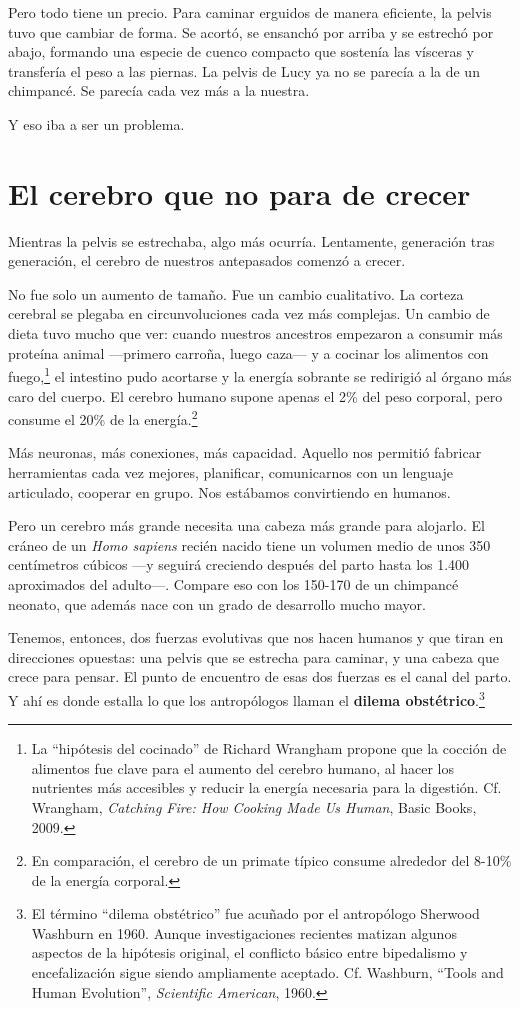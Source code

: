 Pero todo tiene un precio. Para caminar erguidos de manera eficiente, la pelvis tuvo que cambiar de forma. Se acortó, se ensanchó por arriba y se estrechó por abajo, formando una especie de cuenco compacto que sostenía las vísceras y transfería el peso a las piernas. La pelvis de Lucy ya no se parecía a la de un chimpancé. Se parecía cada vez más a la nuestra.

Y eso iba a ser un problema.

\section{El cerebro que no para de crecer}

Mientras la pelvis se estrechaba, algo más ocurría. Lentamente, generación tras generación, el cerebro de nuestros antepasados comenzó a crecer.

No fue solo un aumento de tamaño. Fue un cambio cualitativo. La corteza cerebral se plegaba en circunvoluciones cada vez más complejas. Un cambio de dieta tuvo mucho que ver: cuando nuestros ancestros empezaron a consumir más proteína animal ---primero carroña, luego caza--- y a cocinar los alimentos con fuego,\footnote{La ``hipótesis del cocinado'' de Richard Wrangham propone que la cocción de alimentos fue clave para el aumento del cerebro humano, al hacer los nutrientes más accesibles y reducir la energía necesaria para la digestión. Cf. Wrangham, \textit{Catching Fire: How Cooking Made Us Human}, Basic Books, 2009.} el intestino pudo acortarse y la energía sobrante se redirigió al órgano más caro del cuerpo. El cerebro humano supone apenas el 2\% del peso corporal, pero consume el 20\% de la energía.\footnote{En comparación, el cerebro de un primate típico consume alrededor del 8-10\% de la energía corporal.}

Más neuronas, más conexiones, más capacidad. Aquello nos permitió fabricar herramientas cada vez mejores, planificar, comunicarnos con un lenguaje articulado, cooperar en grupo. Nos estábamos convirtiendo en humanos.

Pero un cerebro más grande necesita una cabeza más grande para alojarlo. El cráneo de un \textit{Homo sapiens} recién nacido tiene un volumen medio de unos 350 centímetros cúbicos ---y seguirá creciendo después del parto hasta los 1.400 aproximados del adulto---. Compare eso con los 150-170 de un chimpancé neonato, que además nace con un grado de desarrollo mucho mayor.

Tenemos, entonces, dos fuerzas evolutivas que nos hacen humanos y que tiran en direcciones opuestas: una pelvis que se estrecha para caminar, y una cabeza que crece para pensar. El punto de encuentro de esas dos fuerzas es el canal del parto. Y ahí es donde estalla lo que los antropólogos llaman el \textbf{dilema obstétrico}.\footnote{El término ``dilema obstétrico'' fue acuñado por el antropólogo Sherwood Washburn en 1960. Aunque investigaciones recientes matizan algunos aspectos de la hipótesis original, el conflicto básico entre bipedalismo y encefalización sigue siendo ampliamente aceptado. Cf. Washburn, ``Tools and Human Evolution'', \textit{Scientific American}, 1960.}


